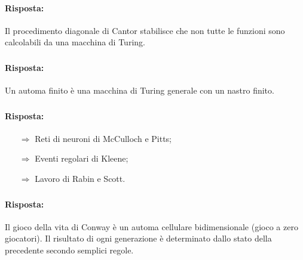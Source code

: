 
\paragraph{Risposta:} Il procedimento diagonale di Cantor stabilisce che non tutte le funzioni 
sono calcolabili da una macchina di Turing.

\subsubsection{}


\paragraph{Risposta:} Un automa finito è una macchina di Turing generale con un nastro finito.

\subsubsection{}


\paragraph{Risposta:}

\begin{itemize}
    \item [$\Rightarrow$] Reti di neuroni di McCulloch e Pitts;
    \item [$\Rightarrow$] Eventi regolari di Kleene;
    \item [$\Rightarrow$] Lavoro di Rabin e Scott.
\end{itemize}

\subsubsection{}


\paragraph{Risposta:} Il gioco della vita di Conway è un automa cellulare bidimensionale (gioco a zero giocatori).
Il risultato di ogni generazione è determinato dallo stato della precedente secondo semplici regole.

